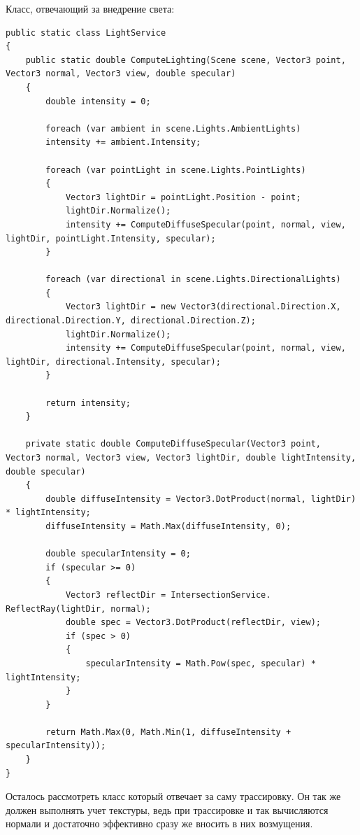 Класс, отвечающий за внедрение света:
\begin{lstlisting}[caption={Класс LightService}, label={lst:3-3}]
public static class LightService
{
	public static double ComputeLighting(Scene scene, Vector3 point, Vector3 normal, Vector3 view, double specular)
	{
		double intensity = 0;
		
		foreach (var ambient in scene.Lights.AmbientLights)
		intensity += ambient.Intensity;
		
		foreach (var pointLight in scene.Lights.PointLights)
		{
			Vector3 lightDir = pointLight.Position - point;
			lightDir.Normalize();
			intensity += ComputeDiffuseSpecular(point, normal, view, lightDir, pointLight.Intensity, specular);
		}
		
		foreach (var directional in scene.Lights.DirectionalLights)
		{
			Vector3 lightDir = new Vector3(directional.Direction.X, directional.Direction.Y, directional.Direction.Z);
			lightDir.Normalize();
			intensity += ComputeDiffuseSpecular(point, normal, view, lightDir, directional.Intensity, specular);
		}
		
		return intensity;
	}
	
	private static double ComputeDiffuseSpecular(Vector3 point, Vector3 normal, Vector3 view, Vector3 lightDir, double lightIntensity, double specular)
	{
		double diffuseIntensity = Vector3.DotProduct(normal, lightDir) * lightIntensity;
		diffuseIntensity = Math.Max(diffuseIntensity, 0);
		
		double specularIntensity = 0;
		if (specular >= 0)
		{
			Vector3 reflectDir = IntersectionService. ReflectRay(lightDir, normal);
			double spec = Vector3.DotProduct(reflectDir, view);
			if (spec > 0)
			{
				specularIntensity = Math.Pow(spec, specular) * lightIntensity;
			}
		}
		
		return Math.Max(0, Math.Min(1, diffuseIntensity + specularIntensity));
	}
}
\end{lstlisting}

Осталось рассмотреть класс который отвечает за саму трассировку. Он так же должен выполнять учет текстуры, ведь при трассировке и так вычисляются нормали и достаточно эффективно сразу же вносить в них возмущения.

